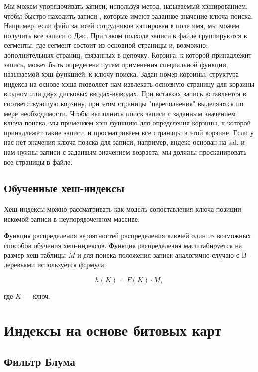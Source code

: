 Мы можем упорядочивать записи, используя метод, называемый хэшированием, чтобы
быстро находить записи , которые имеют заданное значение ключа поиска. Например,
если файл записей сотрудников хэширован в поле имя, мы можем получить все записи
о Джо.  При таком подходе записи в файле группируются в сегменты, где сегмент
состоит из основной страницы и, возможно, дополнительных страниц, связанных в
цепочку.  Корзина, к которой принадлежит запись, может быть определена путем
применения специальной функции, называемой хэш-функцией, к ключу поиска. Задан
номер корзины, структура индекса на основе хэша позволяет нам извлекать основную
страницу для корзины в одном или двух дисковых вводах-выводах.  При вставках
запись вставляется в соответствующую корзину, при этом страницы "переполнения"
выделяются по мере необходимости. Чтобы выполнить поиск записи с заданным
значением ключа поиска, мы применяем хэш-функцию для определения корзины, к
которой принадлежат такие записи, и просматриваем все страницы в этой корзине.
Если у нас нет значения ключа поиска для записи, например, индекс основан на
sal, и нам нужны записи с заданным значением возраста, мы должны просканировать
все страницы в файле.

\subsection{Обученные хеш-индексы}

Хеш-индексы можно рассматривать как модель сопоставления ключа позиции
искомой записи в неупорядоченном массиве.


Функция распределения вероятностей распределения ключей  один из возможных
способов обучения хеш-индексов. Функция распределения масштабируется на размер
хеш-таблицы $M$ и для поиска положения записи аналогично случаю с B-деревьями
используется формула:

\begin{equation}
    h(K) = F(K) \cdot M,
\end{equation}

где $K$ --- ключ.

\section{Индексы на основе битовых карт}

\subsection{Фильтр Блума}

